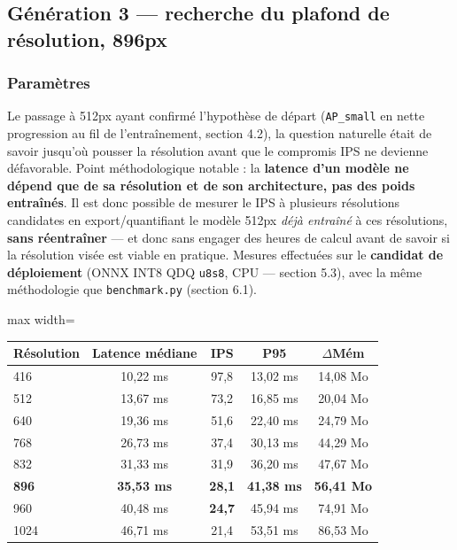 \documentclass[11pt,a4paper]{article}
\let\Oldsubsection\subsection
\renewcommand{\subsection}{\FloatBarrier\Oldsubsection}
\let\Oldsubsubsection\subsubsection
\renewcommand{\subsubsection}{\FloatBarrier\Oldsubsubsection}
\begin{document}
    \subsection{Génération 3 --- recherche du plafond de résolution, 896px}
    
    \subsubsection{Paramètres}
    
    Le passage à 512px ayant confirmé l'hypothèse de départ
    (\texttt{AP\_small} en nette progression au fil de l'entraînement,
    section 4.2), la question naturelle était de savoir jusqu'où pousser
    la résolution avant que le compromis IPS ne devienne défavorable.
    Point méthodologique notable : la \textbf{latence d'un
    modèle ne dépend que de sa résolution et de son architecture, pas des
    poids entraînés}. Il est donc possible de mesurer le IPS à plusieurs
    résolutions candidates en export/quantifiant le modèle 512px
    \emph{déjà entraîné} à ces résolutions, \textbf{sans réentraîner} ---
    et donc sans engager des heures de calcul avant de savoir si la
    résolution visée est viable en pratique. Mesures effectuées
    sur le \textbf{candidat de déploiement} (ONNX INT8 QDQ \texttt{u8s8},
    CPU --- section 5.3), avec la même méthodologie que
    \texttt{benchmark.py} (section 6.1).
    
    \begin{table}[!htbp]
    \centering
    \small
    \begin{adjustbox}{max width=\linewidth}
    \begin{tabular}{@{}lcccc@{}}
    \toprule
    \textbf{Résolution} & \textbf{Latence médiane} & \textbf{IPS} & \textbf{P95} & \textbf{$\Delta$Mém} \\
    \midrule
    416 & 10,22 ms & 97,8 & 13,02 ms & 14,08 Mo \\
    512 & 13,67 ms & 73,2 & 16,85 ms & 20,04 Mo \\
    640 & 19,36 ms & 51,6 & 22,40 ms & 24,79 Mo \\
    768 & 26,73 ms & 37,4 & 30,13 ms & 44,29 Mo \\
    832 & 31,33 ms & 31,9 & 36,20 ms & 47,67 Mo \\
    \textbf{896} & \textbf{35,53 ms} & \textbf{28,1} & \textbf{41,38 ms} & \textbf{56,41 Mo} \\
    960 & 40,48 ms & \textbf{24,7} & 45,94 ms & 74,91 Mo \\
    1024 & 46,71 ms & 21,4 & 53,51 ms & 86,53 Mo \\
    \bottomrule
    \end{tabular}
    \end{adjustbox}
    \end{table}
    
\end{document}
